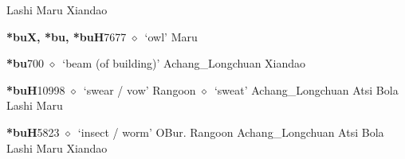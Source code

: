 \begin{list}{}{\leftmargin=1.5em \itemindent=-1.5em}
\hspace{1ex}
         Lashi 
\hspace{1ex}
         Maru 
\hspace{1ex}
         Xiandao 
  \item {\footnotesize \textbf{*buX, *bu, *buH}}{\tiny 7677}
\hspace{1ex}
         $\diamond$~`owl'
         Maru 
  \item {\footnotesize \textbf{*bu}}{\tiny 700}
\hspace{1ex}
         $\diamond$~`beam (of building)'
         Achang\_Longchuan 
\hspace{1ex}
         Xiandao 
  \item {\footnotesize \textbf{*buH}}{\tiny 10998}
\hspace{1ex}
         $\diamond$~`swear / vow'
         Rangoon 
\hspace{1ex}
         $\diamond$~`sweat'
         Achang\_Longchuan 
\hspace{1ex}
         Atsi 
\hspace{1ex}
         Bola 
\hspace{1ex}
         Lashi 
\hspace{1ex}
         Maru 
  \item {\footnotesize \textbf{*buH}}{\tiny 5823}
\hspace{1ex}
         $\diamond$~`insect / worm'
         OBur. 
\hspace{1ex}
         Rangoon 
\hspace{1ex}
         Achang\_Longchuan 
\hspace{1ex}
         Atsi 
\hspace{1ex}
         Bola 
\hspace{1ex}
         Lashi 
\hspace{1ex}
         Maru 
\hspace{1ex}
         Xiandao 
  \end{list}
